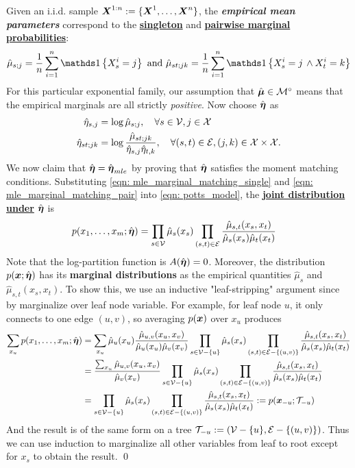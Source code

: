 \documentclass[11pt]{article}
\begin{document}
Given an i.i.d. sample $\boldsymbol{X}^{1:n} := \{\boldsymbol{X}^1,\ldots,\boldsymbol{X}^n\}$, the \emph{\textbf{empirical mean parameters}} correspond to the \underline{\textbf{singleton}} and \underline{\textbf{pairwise marginal probabilities}}:
\begin{align}
\hat{\mu}_{s;j} = \frac{1}{n}\sum_{i=1}^{n}\ind{X_{s}^{i} = j} \text{ and } \hat{\mu}_{st;jk} = \frac{1}{n}\sum_{i=1}^{n}\ind{X_s^{i} = j \, \land X_{t}^{i} = k} \label{eqn: emp_marginal}
\end{align} For this particular exponential family, our assumption that $\hat{\boldsymbol{\mu}} \in {\mathcal M}^{\circ}$ means that the empirical marginals are all strictly \emph{positive}. 
Now choose $\hat{\boldsymbol{\eta}}$ as
\begin{align}
\hat{\eta}_{s,j} &= \log \hat{\mu}_{s;j}, \quad \forall s\in {\mathcal V}, j \in {\mathcal X} \label{eqn: mle_marginal_matching_single}\\
\hat{\eta}_{st;jk} &= \log \frac{ \hat{\mu}_{st;jk}}{\hat{\eta}_{s,j} \hat{\eta}_{t,k}}, \quad \forall (s,t) \in {\mathcal E}, (j, k) \in {\mathcal X} \times {\mathcal X}. \label{eqn: mle_marginal_matching_pair}
\end{align} We now claim that $\hat{\boldsymbol{\eta}} = \hat{\boldsymbol{\eta}}_{mle}$ by proving that $\hat{\boldsymbol{\eta}}$ satisfies the moment matching conditions. Substituting \eqref{eqn: mle_marginal_matching_single} and \eqref{eqn: mle_marginal_matching_pair} into \eqref{eqn: potts_model},  the \underline{\textbf{joint distribution under}} $\hat{\boldsymbol{\eta}}$ is 
\begin{align}
p(x_1, \ldots, x_m; \hat{\boldsymbol{\eta}}) &=\prod_{s\in {\mathcal V}}\hat{\mu}_{s}(x_s)\prod_{(s,t) \in {\mathcal E}}\frac{\hat{\mu}_{s,t}(x_s, x_t)}{\hat{\mu}_{s}(x_s)\hat{\mu}_{t}(x_t)} \label{eqn: mle_joint_dist}
\end{align} Note that the log-partition function is $A(\hat{\boldsymbol{\eta}}) = 0$. Moreover, the distribution $p(\boldsymbol{x}; \hat{\boldsymbol{\eta}})$ has its \textbf{marginal distributions} as the empirical quantities $\hat{\mu}_{s}$ and $\hat{\mu}_{s,t}(x_s, x_t)$. To show this, we use an inductive "leaf-stripping" argument since by marginalize over leaf node variable. For example, for leaf node $u$, it only connects to one edge $(u,v)$, so averaging $p(\boldsymbol{x})$ over $x_u$ produces 
\begin{align*}
\sum_{x_u}p(x_1, \ldots, x_m; \hat{\boldsymbol{\eta}})&=\sum_{x_u}\hat{\mu}_{u}(x_u)\frac{\hat{\mu}_{u,v}(x_u, x_v)}{\hat{\mu}_{u}(x_u)\hat{\mu}_{v}(x_v)} \prod_{s\in {\mathcal V} - \{u\}}\hat{\mu}_{s}(x_s)\prod_{(s,t) \in {\mathcal E} - \{(u,v)\}}\frac{\hat{\mu}_{s,t}(x_s, x_t)}{\hat{\mu}_{s}(x_s)\hat{\mu}_{t}(x_t)}\\
&=\frac{ \sum_{x_u}\hat{\mu}_{u,v}(x_u, x_v)}{\hat{\mu}_{v}(x_v)} \prod_{s\in {\mathcal V} - \{u\}}\hat{\mu}_{s}(x_s)\prod_{(s,t) \in {\mathcal E} - \{(u,v)\}}\frac{\hat{\mu}_{s,t}(x_s, x_t)}{\hat{\mu}_{s}(x_s)\hat{\mu}_{t}(x_t)}\\
&= \prod_{s\in {\mathcal V} - \{u\}}\hat{\mu}_{s}(x_s)\prod_{(s,t) \in {\mathcal E} - \{(u,v)\}}\frac{\hat{\mu}_{s,t}(x_s, x_t)}{\hat{\mu}_{s}(x_s)\hat{\mu}_{t}(x_t)} := p(\boldsymbol{x}_{-u}; {\mathcal T}_{-u})
\end{align*} And the result is of the same form on a tree ${\mathcal T}_{-u} := ({\mathcal V} - \{u\},  {\mathcal E} - \{(u,v)\})$. Thus we can use induction to marginalize all other variables from leaf to root except for $x_s$ to obtain the result. \qed
\end{document}
